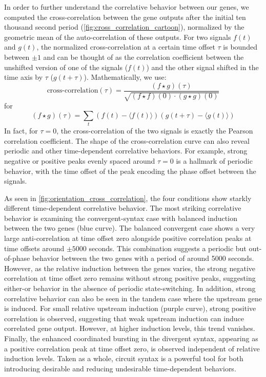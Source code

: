 \documentclass[11pt]{article}
\begin{document}
In order to further understand the correlative behavior between our genes, we computed the cross-correlation between the gene outputs after the initial ten thousand second period (\cref{fig:cross_correlation_cartoon}), normalized by the geometric mean of the auto-correlation of these outputs. For two signals \(f(t)\) and \(g(t)\), the normalized cross-correlation at a certain time offset \(\tau\) is bounded between \(\pm1\) and can be thought of as the correlation coefficient between the unshifted version of one of the signals (\(f(t)\)) and the other signal shifted in the time axis by \(\tau\) (\(g(t + \tau)\)). Mathematically, we use:
\begin{equation}
\text{cross-correlation}(\tau) = \frac{(f \star g)(\tau)}{\sqrt{(f \star f)(0) \cdot (g \star g)(0)}}
\end{equation}
for
\begin{equation}
    (f \star g)(\tau) = \sum_t (f(t) - \langle f(t)\rangle)(g(t+\tau) - \langle g(t)\rangle)
\end{equation}
In fact, for \(\tau = 0\), the cross-correlation of the two signals is exactly the Pearson correlation coefficient. The shape of the cross-correlation curve can also reveal periodic and other time-dependent correlative behaviors. For example, strong negative or positive peaks evenly spaced around \(\tau = 0\) is a hallmark of periodic behavior, with the time offset of the peak encoding the phase offset between the signals.

As seen in \cref{fig:orientation_cross_correlation}, the four conditions show starkly different time-dependent correlative behavior. The most striking correlative behavior is examining the convergent-syntax case with balanced induction between the two genes (blue curve). The balanced convergent case shows a very large anti-correlation at time offset zero alongside positive correlation peaks at time offsets around \(\pm5000\) seconds. This combination suggests a periodic but out-of-phase behavior between the two genes with a period of around 5000 seconds. However, as the relative induction between the genes varies, the strong negative correlation at time offset zero remains without strong positive peaks, suggesting either-or behavior in the absence of periodic state-switching. In addition, strong correlative behavior can also be seen in the tandem case where the upstream gene is induced. For small relative upstream induction (purple curve), strong positive correlation is observed, suggesting that weak upstream induction can induce correlated gene output. However, at higher induction levels, this trend vanishes. Finally, the enhanced coordinated bursting in the divergent syntax, appearing as a positive correlation peak at time offset zero, is observed independent of relative induction levels.
Taken as a whole, circuit syntax is a powerful tool for both introducing desirable and reducing undesirable time-dependent behaviors.
\end{document}
